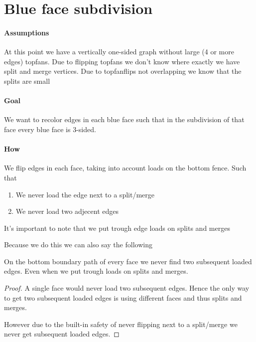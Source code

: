 
\section{Blue face subdivision}

\paragraph{Assumptions}
At this point we have a vertically one-sided graph without large (4 or more edges) topfans. Due to flipping topfans we don't know where exactly we have split and merge vertices. Due to topfanflips not overlapping we know that the splits are small 

\paragraph{Goal}
We want to recolor edges in each blue face such that in the subdivision of that face every blue face is 3-sided.


\paragraph{How}
We flip edges in each face, taking into account loads on the bottom fence. Such that

\begin{enumerate}
  \item We never load the edge next to a split/merge
  \item We never load two adjecent edges
\end{enumerate}

It's important to note that we put trough edge loads on splits and merges

Because we do this we can also say the following

\begin{lemma}
  \label{lm:}
  On the bottom boundary path of every face we never find two subsequent loaded edges. Even when we put trough loads on splits and merges.
\end{lemma}
\begin{proof}
  A single face would never load two subsequent edges. Hence the only way to get two subsequent loaded edges is using different faces and thus splits and merges.

  However due to the built-in safety of never flipping next to a split/merge we never get subsequent    loaded edges.
\end{proof}

